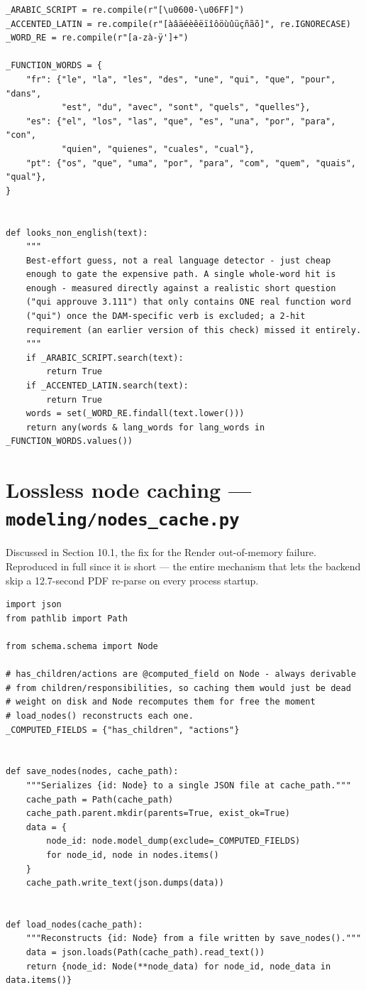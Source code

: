 \begin{lstlisting}[caption={llm/translate.py — looks\_non\_english}]
_ARABIC_SCRIPT = re.compile(r"[\u0600-\u06FF]")
_ACCENTED_LATIN = re.compile(r"[àâäéèêëïîôöùûüçñãõ]", re.IGNORECASE)
_WORD_RE = re.compile(r"[a-zà-ÿ']+")

_FUNCTION_WORDS = {
    "fr": {"le", "la", "les", "des", "une", "qui", "que", "pour", "dans",
           "est", "du", "avec", "sont", "quels", "quelles"},
    "es": {"el", "los", "las", "que", "es", "una", "por", "para", "con",
           "quien", "quienes", "cuales", "cual"},
    "pt": {"os", "que", "uma", "por", "para", "com", "quem", "quais", "qual"},
}


def looks_non_english(text):
    """
    Best-effort guess, not a real language detector - just cheap
    enough to gate the expensive path. A single whole-word hit is
    enough - measured directly against a realistic short question
    ("qui approuve 3.111") that only contains ONE real function word
    ("qui") once the DAM-specific verb is excluded; a 2-hit
    requirement (an earlier version of this check) missed it entirely.
    """
    if _ARABIC_SCRIPT.search(text):
        return True
    if _ACCENTED_LATIN.search(text):
        return True
    words = set(_WORD_RE.findall(text.lower()))
    return any(words & lang_words for lang_words in _FUNCTION_WORDS.values())
\end{lstlisting}
\section{Lossless node caching — \texttt{modeling/\allowbreak{}nodes\_\allowbreak{}cache.py}}
Discussed in Section 10.1, the fix for the Render out-of-memory failure. Reproduced in full since it is short — the entire mechanism that lets the backend skip a 12.7-second PDF re-parse on every process startup.

\begin{lstlisting}[caption={modeling/nodes\_cache.py — complete file}]
import json
from pathlib import Path

from schema.schema import Node

# has_children/actions are @computed_field on Node - always derivable
# from children/responsibilities, so caching them would just be dead
# weight on disk and Node recomputes them for free the moment
# load_nodes() reconstructs each one.
_COMPUTED_FIELDS = {"has_children", "actions"}


def save_nodes(nodes, cache_path):
    """Serializes {id: Node} to a single JSON file at cache_path."""
    cache_path = Path(cache_path)
    cache_path.parent.mkdir(parents=True, exist_ok=True)
    data = {
        node_id: node.model_dump(exclude=_COMPUTED_FIELDS)
        for node_id, node in nodes.items()
    }
    cache_path.write_text(json.dumps(data))


def load_nodes(cache_path):
    """Reconstructs {id: Node} from a file written by save_nodes()."""
    data = json.loads(Path(cache_path).read_text())
    return {node_id: Node(**node_data) for node_id, node_data in data.items()}
\end{lstlisting}
